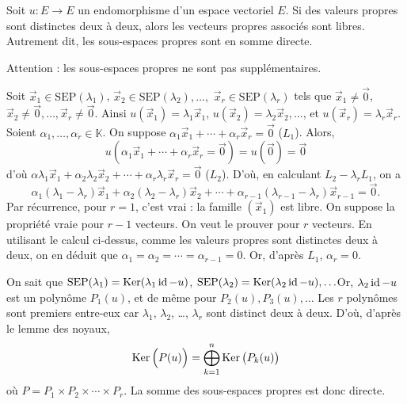 \begin{prop}
	Soit $u : E \to E$\/ un endomorphisme d'un espace vectoriel $E$. Si des valeurs propres sont distinctes deux à deux, alors les vecteurs propres associés sont libres. Autrement dit, les sous-espaces propres sont en somme directe.
\end{prop}

Attention : les sous-espaces propres {\color{red} ne sont pas supplémentaires}.

\begin{prv}[méthode 1]
	Soit $\vec{x}_1 \in \mathrm{SEP}(\lambda_1)$, $\vec{x}_2 \in \mathrm{SEP}(\lambda_2),\ldots,$ $\vec{x}_r \in \mathrm{SEP}(\lambda_r)$\/ tels que $\vec{x}_1 \neq \vec{0}$, $\vec{x}_2 \neq \vec{0},\ldots,\vec{x}_{r} \neq \vec{0}$. Ainsi $u(\vec{x}_1) = \lambda_1 \vec{x}_1$, $u(\vec{x}_2) = \lambda_2 \vec{x}_2,\ldots$, et $u(\vec{x}_r) = \lambda_r \vec{x}_r$.
	Soient $\alpha_1, \ldots, \alpha_r \in \mathds{K}$. On suppose $\alpha_1 \vec{x}_1 + \cdots + \alpha_r \vec{x}_r = \vec{0}$ ($L_1$). Alors, \[
		u(\alpha_1 \vec{x}_1 + \cdots + \alpha_r \vec{x}_r = \vec{0}) = u(\vec{0}) = \vec{0}
	\] d'où $\alpha \lambda_1 \vec{x}_1 + \alpha_2 \lambda_2 \vec{x}_2 + \cdots + \alpha_r \lambda_r \vec{x}_r = \vec{0}$ ($L_2$).
	D'où, en calculant $L_2 - \lambda_r L_1$, on a \[
		\alpha_1 (\lambda_1 - \lambda_r) \vec{x}_1 + \alpha_2(\lambda_2-\lambda_r) \vec{x}_2 + \cdots + \alpha_{r-1}(\lambda_{r-1} - \lambda_r) \vec{x}_{r-1} = \vec{0}
	.\]
	Par récurrence, pour $r=1$, c'est vrai : la famille $(\vec{x}_1)$\/ est libre.
	On suppose la propriété vraie pour $r-1$\/ vecteurs. On veut le prouver pour $r$\/ vecteurs. En utilisant le calcul ci-dessus, comme les valeurs propres sont distinctes deux à deux, on en déduit que $\alpha_1 = \alpha_2 = \cdots = \alpha_{r-1} = 0$.
	Or, d'après $L_1$, $\alpha_r = 0$.
\end{prv}

\begin{prv}[méthode 2]
	On sait que $\mathrm{SEP}(\lambda_1) = \operatorname{Ker}(\lambda_1\operatorname{id} - u)$, $\mathrm{SEP}(\lambda_2) = \operatorname{Ker}(\lambda_2\operatorname{id} - u),\ldots$\@ Or, $\lambda_2\operatorname{id} - u$\/ est un polynôme $P_1(u)$, et de même pour $P_2(u),P_3(u),\ldots$\@
	Les $r$\/ polynômes sont premiers entre-eux car $\lambda_1$, $\lambda_2$, \ldots, $\lambda_r$ sont distinct deux à deux. D'où, d'après le lemme des noyaux, \[
		\operatorname{Ker}\Big(P(u)\Big) = \bigoplus_{k=1}^n \operatorname{Ker}\big(P_k(u)\big)
	\] où $P = P_1 \times P_2 \times \cdots \times P_r$.
	La somme des sous-espaces propres est donc directe.
\end{prv}

